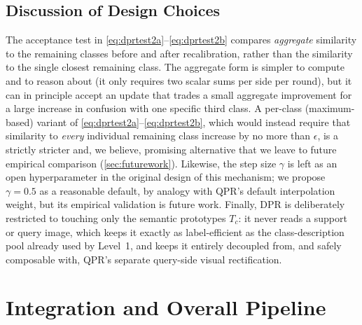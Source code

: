 \documentclass{iutbscthesis}
\begin{document}
\subsection{Discussion of Design Choices}

The acceptance test in \autoref{eq:dprtest2a}--\autoref{eq:dprtest2b} compares \emph{aggregate} similarity to the remaining classes before and after recalibration, rather than the similarity to the single closest remaining class. The aggregate form is simpler to compute and to reason about (it only requires two scalar sums per side per round), but it can in principle accept an update that trades a small aggregate improvement for a large increase in confusion with one specific third class. A per-class (maximum-based) variant of \autoref{eq:dprtest2a}--\autoref{eq:dprtest2b}, which would instead require that similarity to \emph{every} individual remaining class increase by no more than $\epsilon$, is a strictly stricter and, we believe, promising alternative that we leave to future empirical comparison (\autoref{sec:futurework}). Likewise, the step size $\gamma$ is left as an open hyperparameter in the original design of this mechanism; we propose $\gamma = 0.5$ as a reasonable default, by analogy with QPR's default interpolation weight, but its empirical validation is future work. Finally, DPR is deliberately restricted to touching only the semantic prototypes $T_c$: it never reads a support or query image, which keeps it exactly as label-efficient as the class-description pool already used by Level~1, and keeps it entirely decoupled from, and safely composable with, QPR's separate query-side visual rectification.

\section{Integration and Overall Pipeline}
\label{sec:integration}
\end{document}
